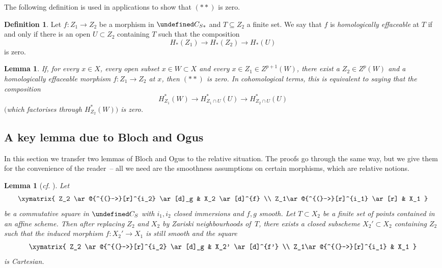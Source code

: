 \documentclass[10pt,a4paper]{article}
\let\cal\undefined
\numberwithin{equation}{section}
\newtheorem{lemma}[theorem]{Lemma}
\newtheorem{Key lemma}[theorem]{Key lemma}
\theoremstyle{definition}
\newtheorem{definition}[theorem]{Definition}
\theoremstyle{remark}
\newcommand{\To}{\longrightarrow}
\newcommand{\cal}{\mathcal}
\begin{document}
The following definition is used in applications to show that $(**)$ is zero.

\begin{definition}
Let $f\colon Z_1\to Z_2$ be a morphism in $\cal C_{S*}$ and $T\subseteq Z_2$ a finite set. We say that $f$ is \textit{homologically effaceable} at $T$ if and only if there is an open $U\subset Z_2$ containing $T$ such that the composition
$$
H_*(Z_1)\To H_*(Z_2)\To H_*(U)
$$
is zero.
\end{definition}

\begin{lemma}\label{lemma_effaceability}
If, for every $x\in X$, every open subset $x\in W\subset X$ and every $x\in Z_1\in Z^{p+1}(W)$, there exist a $Z_2\in Z^p(W)$ and a homologically effaceable morphism $f\colon Z_1\to Z_2$ at $x$, then $(**)$ is zero. In cohomological terms, this is equivalent to saying that the composition 
$$
H^*_{Z_1}(W)\To H^*_{Z_1\cap U}(U)\To H^*_{Z_2\cap U}(U)
$$
$($which factorises through $H^*_{Z_2}(W))$ is zero.
\end{lemma}



\subsection{A key lemma due to Bloch and Ogus}
In this section we transfer two lemmas of Bloch and Ogus to the relative situation. The proofs go through the same way, but we give them for the convenience of the reader~-- all we need are the smoothness assumptions on certain morphisms, which are relative notions. 

\begin{lemma}[\textit{cf.} {\cite[Lemma~5.1]{BO74}}]\label{lemma_cartesian_square}
Let 
\[
  \xymatrix{ 
  Z_2 \ar@{^{(}->}[r]^{i_2}  \ar[d]_g & X_2 \ar[d]^{f}  \\
   Z_1\ar@{^{(}->}[r]^{i_1} \ar[r] & X_1 
   }
\]
be a commutative square in $\cal C_S$ with $i_1,i_2$ closed immersions and $f,g$ smooth. Let $T\subset X_2$ be a finite set of points contained in an affine scheme. Then after replacing $Z_2$ and $X_2$ by Zariski neighbourhoods of\, $T$, there exists a closed subscheme $X_2'\subset X_2$ containing $Z_2$ such that the induced morphism $f\colon X_2'\to X_1$ is still smooth and the square
\[
  \xymatrix{ 
  Z_2 \ar@{^{(}->}[r]^{i_2}  \ar[d]_g & X_2' \ar[d]^{f'}  \\
   Z_1\ar@{^{(}->}[r]^{i_1}  & X_1 
   }
\]
is Cartesian.
\end{lemma}
\end{document}
